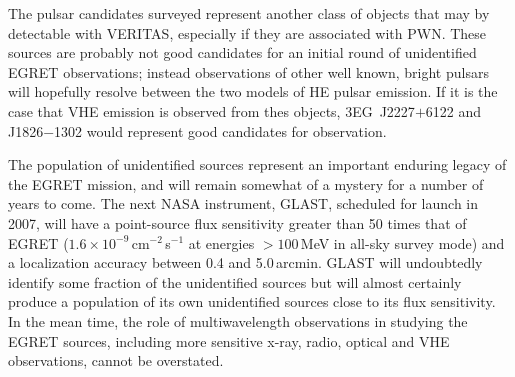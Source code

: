 The pulsar candidates surveyed represent another class of objects that
may by detectable with VERITAS, especially if they are associated with
PWN. These sources are probably not good candidates for an initial
round of unidentified EGRET observations; instead observations of
other well known, bright pulsars will hopefully resolve between the
two models of HE pulsar emission. If it is the case that VHE emission
is observed from thes objects, 3EG~J2227$+$6122 and J1826$-$1302 would
represent good candidates for observation.

The population of unidentified sources represent an important enduring
legacy of the EGRET mission, and will remain somewhat of a mystery for
a number of years to come. The next NASA \Gray instrument, GLAST,
scheduled for launch in 2007, will have a point-source flux
sensitivity greater than 50 times that of EGRET
($1.6\times10^{-9}$\,cm$^{-2}$\,s$^{-1}$ at energies $>100$\,MeV in
all-sky survey mode) and a localization accuracy between 0.4 and
5.0\,arcmin. GLAST will undoubtedly identify some fraction of the
unidentified sources but will almost certainly produce a population of
its own unidentified sources close to its flux sensitivity. In the
mean time, the role of multiwavelength observations in studying the
EGRET sources, including more sensitive x-ray, radio, optical and VHE
\Gray observations, cannot be overstated.
